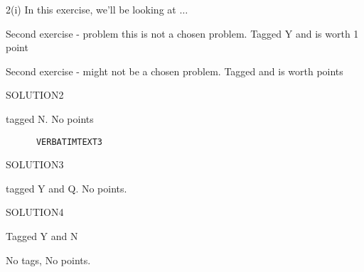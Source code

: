 \begin{intro}
	2(i) In this exercise, we'll be looking at \( \dots \)
\end{intro}
\begin{problem}
  Second exercise - problem this is not a chosen problem. Tagged Y and is worth 1 point
\end{problem}
\begin{problem}
  Second exercise - might not be a chosen problem. \makeatletter Tagged \exb@currentTags and is worth \exb@currentPoints points\makeatother
\end{problem}
\begin{solution}
	SOLUTION2
\end{solution}
\begin{problem}
  \lipsum[1] tagged N. No points
\begin{verbatim}
      VERBATIMTEXT3
  \end{verbatim}
\end{problem}
\begin{solution}
	SOLUTION3
\end{solution}
\begin{problem}
tagged Y and Q. No points. \lipsum[2-3]
\end{problem}
\begin{solution}
	SOLUTION4
\end{solution}
\begin{problem}
\lipsum[4] Tagged Y and N
\end{problem}
\begin{problem}
\lipsum[4] No tags, No points.
\end{problem}
